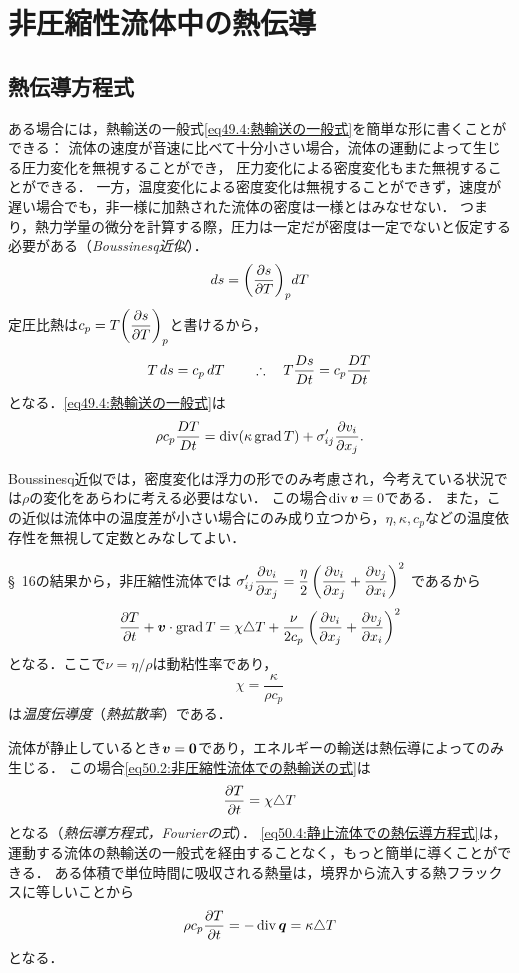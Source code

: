 \section{非圧縮性流体中の熱伝導}
\subsection*{熱伝導方程式}
ある場合には，熱輸送の一般式\eqref{eq49.4:熱輸送の一般式}を簡単な形に書くことができる：
流体の速度が音速に比べて十分小さい場合，流体の運動によって生じる圧力変化を無視することができ，
圧力変化による密度変化もまた無視することができる．
一方，温度変化による密度変化は無視することができず，速度が遅い場合でも，非一様に加熱された流体の密度は一様とはみなせない．
つまり，熱力学量の微分を計算する際，圧力は一定だが密度は一定でないと仮定する必要がある（\emph{Boussinesq近似}）．
\[
    ds = \PDV{s}{T}{p} dT
\]
定圧比熱は$c_p = T \dPDV{s}{T}{p}$と書けるから，
\[
    T \, ds = c_p \, dT \qquad \therefore\quad T \frac{Ds}{Dt} = c_p \frac{DT}{Dt}
\]
となる．\eqref{eq49.4:熱輸送の一般式}は
\begin{equation}
    \rho c_p \frac{DT}{Dt} = \operatorname{div}(\kappa \operatorname{grad} T) + \sigma_{ij}' \pdv{v_i}{x_j} .
\end{equation}


Boussinesq近似では，密度変化は浮力の形でのみ考慮され，今考えている状況では$\rho$の変化をあらわに考える必要はない．
この場合$\operatorname{div} \vb*{v}=0$である．
また，この近似は流体中の温度差が小さい場合にのみ成り立つから，$\eta,\kappa,c_p$などの温度依存性を無視して定数とみなしてよい．

\S~16の結果から，非圧縮性流体では
$\sigma'_{ij} \dpdv{v_i}{x_j} = \dfrac{\eta}{2} \left( \dpdv{v_i}{x_j} + \dpdv{v_j}{x_i} \right)^2$
であるから
\begin{equation}\label{eq50.2:非圧縮性流体での熱輸送の式}
    \pdv{T}{t} + \vb*{v} \cdot \operatorname{grad} T = \chi \triangle T + \frac{\nu}{2c_p} \left( \pdv{v_i}{x_j} + \pdv{v_j}{x_i} \right)^2
\end{equation}
となる．ここで$\nu=\eta/\rho$は動粘性率であり，
\begin{equation}
    \chi = \frac{\kappa}{\rho c_p}
\end{equation}
は\emph{温度伝導度}（\emph{熱拡散率}）である．


流体が静止しているとき$\vb*{v}=\vb*{0}$であり，エネルギーの輸送は熱伝導によってのみ生じる．
この場合\eqref{eq50.2:非圧縮性流体での熱輸送の式}は
\begin{equation}\label{eq50.4:静止流体での熱伝導方程式}
    \pdv{T}{t} = \chi \triangle T
\end{equation}
となる（\emph{熱伝導方程式，Fourierの式}）．
\eqref{eq50.4:静止流体での熱伝導方程式}は，運動する流体の熱輸送の一般式を経由することなく，もっと簡単に導くことができる．
ある体積で単位時間に吸収される熱量は，境界から流入する熱フラックスに等しいことから
\[
    \rho c_p \pdv{T}{t} = -\operatorname{div} \vb*{q} = \kappa \triangle T
\]
となる．




